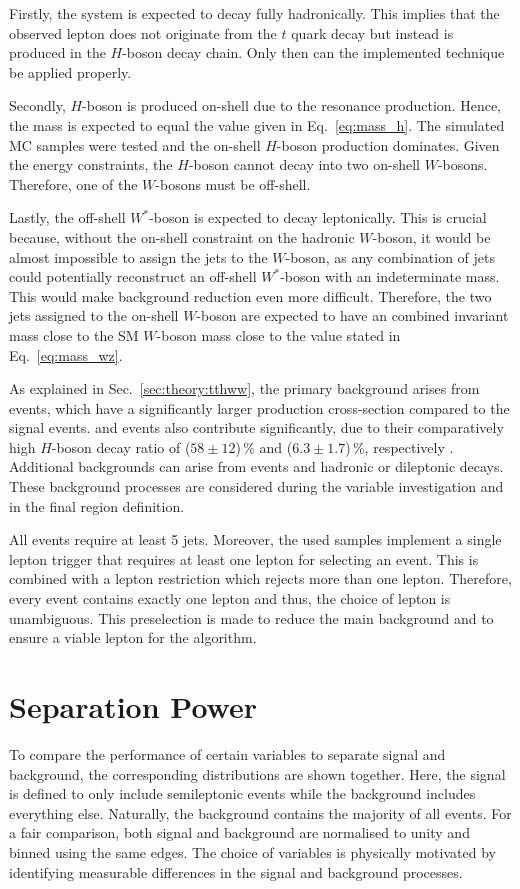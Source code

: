 \documentclass[bachelor,ngerman,english]{GAUBM}
\begin{document}
Firstly, the \ttbar system is expected to decay fully hadronically. This implies that the observed lepton does not originate from the $t$ quark decay but instead is produced in the $H$-boson decay chain. Only then can the implemented \NW technique be applied properly.

Secondly, $H$-boson is produced on-shell due to the resonance production. Hence, the mass is expected to equal the value given in Eq.~\ref{eq:mass_h}. The simulated MC samples were tested and the on-shell $H$-boson production dominates. Given the energy constraints, the $H$-boson cannot decay into two on-shell $W$-bosons. Therefore, one of the $W$-bosons must be off-shell. 

Lastly, the off-shell $W^*$-boson is expected to decay leptonically. This is crucial because, without the on-shell constraint on the hadronic $W$-boson, it would be almost impossible to assign the jets to the $W$-boson, as any combination of jets could potentially reconstruct an off-shell $W^*$-boson with an indeterminate mass. This would make background reduction even more difficult. Therefore, the two jets assigned to the on-shell $W$-boson are expected to have an combined invariant mass close to the SM $W$-boson mass close to the value stated in Eq.~\ref{eq:mass_wz}.

As explained in Sec.~\ref{sec:theory:tthww}, the primary background arises from \ttbar events, which have a significantly larger production cross-section compared to the signal \ttHWW events. \ttHbb and \ttHtautau events also contribute significantly, due to their comparatively high $H$-boson decay ratio of ($58\pm12$)\,\% and ($6.3\pm1.7$)\,\%, respectively \cite{yellow_report_4_higgs}. Additional backgrounds can arise from \ttHcc events and hadronic or dileptonic \ttHWW decays. These background processes are considered during the variable investigation and in the final region definition.

All events require at least 5 jets. Moreover, the used samples implement a single lepton trigger that requires at least one lepton for selecting an event. This is combined with a lepton restriction which rejects more than one lepton. Therefore, every event contains exactly one lepton and thus, the choice of lepton is unambiguous. This preselection is made to reduce the main \ttbar background and to ensure a viable lepton for the \NW algorithm. 

\section{Separation Power}
\label{sec:event_selection:separation_power}
To compare the performance of certain variables to separate signal and background, the corresponding distributions are shown together. Here, the signal is defined to only include semileptonic \ttHWW events while the background includes everything else. Naturally, the background contains the majority of all events. For a fair comparison, both signal and background are normalised to unity and binned using the same edges. The choice of variables is physically motivated by identifying measurable differences in the signal and background processes.
\end{document}
